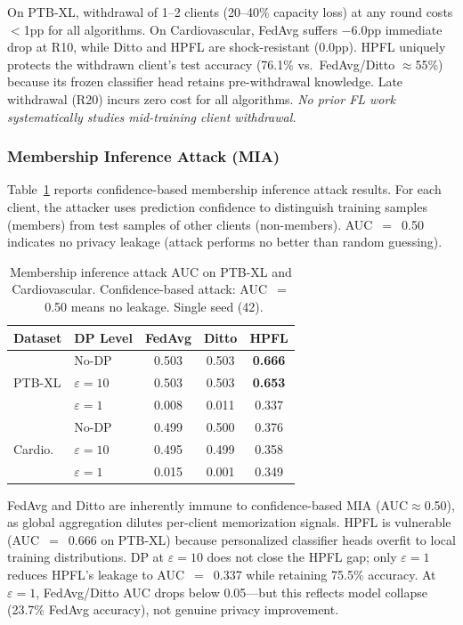 \documentclass[conference]{IEEEtran}
\begin{document}
\begin{table}[htbp]
\vspace{1mm}
\footnotesize{On PTB-XL, withdrawal of 1--2 clients (20--40\% capacity loss) at any round costs $<$1pp for all algorithms. On Cardiovascular, FedAvg suffers $-$6.0pp immediate drop at R10, while Ditto and HPFL are shock-resistant (0.0pp). HPFL uniquely protects the withdrawn client's test accuracy (76.1\% vs.\ FedAvg/Ditto $\approx$55\%) because its frozen classifier head retains pre-withdrawal knowledge. Late withdrawal (R20) incurs zero cost for all algorithms. \textit{No prior FL work systematically studies mid-training client withdrawal.}}
\end{table}

\subsubsection{Membership Inference Attack (MIA)}
\label{sec:mia}

Table~\ref{tab:mia_results} reports confidence-based membership inference attack results. For each client, the attacker uses prediction confidence to distinguish training samples (members) from test samples of other clients (non-members). AUC~$=$~0.50 indicates no privacy leakage (attack performs no better than random guessing).

\begin{table}[htbp]
\centering
\caption{Membership inference attack AUC on PTB-XL and Cardiovascular. Confidence-based attack: AUC~$=$~0.50 means no leakage. Single seed (42).}
\label{tab:mia_results}
\small
\begin{tabular}{llccc}
\toprule
\textbf{Dataset} & \textbf{DP Level} & \textbf{FedAvg} & \textbf{Ditto} & \textbf{HPFL} \\
\midrule
\multirow{3}{*}{PTB-XL} & No-DP & 0.503 & 0.503 & \textbf{0.666} \\
 & $\varepsilon{=}10$ & 0.503 & 0.503 & \textbf{0.653} \\
 & $\varepsilon{=}1$ & 0.008 & 0.011 & 0.337 \\
\midrule
\multirow{3}{*}{Cardio.} & No-DP & 0.499 & 0.500 & 0.376 \\
 & $\varepsilon{=}10$ & 0.495 & 0.499 & 0.358 \\
 & $\varepsilon{=}1$ & 0.015 & 0.001 & 0.349 \\
\bottomrule
\end{tabular}

\vspace{1mm}
\footnotesize{FedAvg and Ditto are inherently immune to confidence-based MIA (AUC$\approx$0.50), as global aggregation dilutes per-client memorization signals. HPFL is vulnerable (AUC~$=$~0.666 on PTB-XL) because personalized classifier heads overfit to local training distributions. DP at $\varepsilon{=}10$ does not close the HPFL gap; only $\varepsilon{=}1$ reduces HPFL's leakage to AUC~$=$~0.337 while retaining 75.5\% accuracy. At $\varepsilon{=}1$, FedAvg/Ditto AUC drops below 0.05---but this reflects model collapse (23.7\% FedAvg accuracy), not genuine privacy improvement.}
\end{table}
\end{document}

